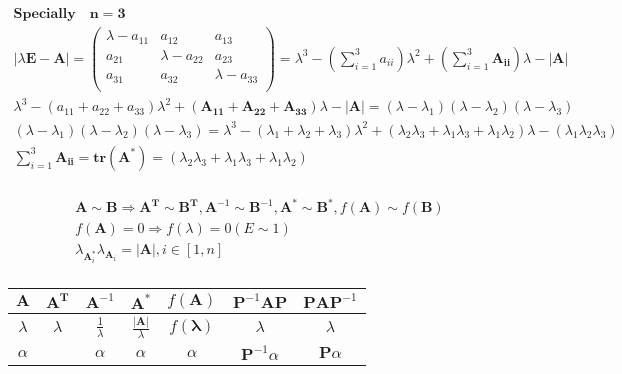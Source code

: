\documentclass{article}
\begin{document}
\begin{align*}
    \bm{Specially \quad n = 3} \\ 
    |\lambda\mathbf{E}-\mathbf{A}| = \left( 
        \begin{array}{ccc}
            \lambda-a_{11} & a_{12} & a_{13} \\  
            a_{21} & \lambda-a_{22} & a_{23}  \\ 
            a_{31} & a_{32} & \lambda-a_{33} \\ 
        \end{array}  
    \right) = \lambda^{3}-\left(\sum_{i=1}^{3}a_{ii}\right)\lambda^{2}+\left(\sum_{i=1}^{3}\mathbf{A_{ii}}\right)\lambda-|\mathbf{A}|\\
    \lambda^{3}-(a_{11}+a_{22}+a_{33})\lambda^{2}+(\mathbf{A_{11}}+\mathbf{A_{22}}+\mathbf{A_{33}})\lambda-|\mathbf{A}| = (\lambda-\lambda_{1})(\lambda-\lambda_{2})(\lambda-\lambda_{3}) \\ 
    (\lambda-\lambda_{1})(\lambda-\lambda_{2})(\lambda-\lambda_{3}) = \lambda^{3}-(\lambda_{1}+\lambda_{2}+\lambda_{3})\lambda^{2}+(\lambda_{2}\lambda_{3}+\lambda_{1}\lambda_{3}+\lambda_{1}\lambda_{2})\lambda-(\lambda_{1}\lambda_{2}\lambda_{3}) \\ 
    \sum_{i=1}^{3}\mathbf{A_{ii}} = \mathbf{tr}(\mathbf{A}^{*}) = (\lambda_{2}\lambda_{3}+\lambda_{1}\lambda_{3}+\lambda_{1}\lambda_{2})\\ 
\end{align*}

\begin{align*}
    \mathbf{A} \sim \mathbf{B} \Longrightarrow \mathbf{A}^{\mathbf{T}} \sim \mathbf{B}^{\mathbf{T}},\mathbf{A}^{-1} \sim \mathbf{B}^{-1},\mathbf{A}^{\mathbf{*}} \sim \mathbf{B}^{\mathbf{*}},f(\mathbf{A}) \sim f(\mathbf{B}) \\ 
    f(\mathbf{A})=0 \Rightarrow f(\lambda) = 0 (E \sim 1)\\ 
    \lambda_{\mathbf{A}^{*}_{i}} \lambda_{\mathbf{A}_{i}} = |\mathbf{A}|,i \in [1,n]\\ 
\end{align*}

\begin{tabular}{|c|c|c|c|c|c|c|}%
    \hline 
    $\mathbf{A}$ & $\mathbf{A}^{\mathbf{T}}$ & $\mathbf{A}^{-1}$ & $\mathbf{A}^{*}$ & $f(\mathbf{A})$ & $\mathbf{P}^{-1}\mathbf{A}\mathbf{P}$ & $\mathbf{P}\mathbf{A}\mathbf{P}^{-1}$ \\   
    \hline
    $\lambda$ & $\lambda$ & $\frac{1}{\lambda}$ & $\frac{|\mathbf{A}|}{\lambda}$ & $f(\mathbf{\lambda})$ & $\lambda$ & $\lambda$ \\ 
    \hline 
    $\alpha$ & & $\alpha$ & $\alpha$ & $\alpha$ & $\mathbf{P}^{-1}\alpha$ & $\mathbf{P}\alpha$ \\ 
    \hline 
\end{tabular}
\end{document}
